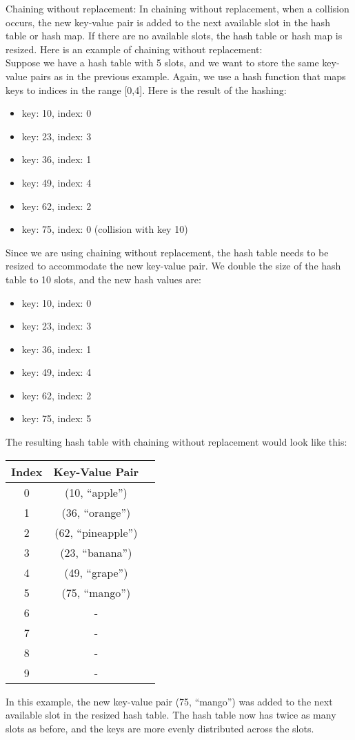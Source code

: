 \documentclass{article}
\begin{document}
Chaining without replacement: In chaining without replacement, when a collision occurs, the new key-value pair is added to the next available slot in the hash table or hash map. If there are no available slots, the hash table or hash map is resized. Here is an example of chaining without replacement:\\

Suppose we have a hash table with 5 slots, and we want to store the same key-value pairs as in the previous example. Again, we use a hash function that maps keys to indices in the range [0,4]. Here is the result of the hashing:

\begin{itemize}
	\item key: 10, index: 0
	\item key: 23, index: 3
	\item key: 36, index: 1
	\item key: 49, index: 4
	\item key: 62, index: 2
	\item key: 75, index: 0 (collision with key 10)
\end{itemize}
Since we are using chaining without replacement, the hash table needs to be resized to accommodate the new key-value pair. We double the size of the hash table to 10 slots, and the new hash values are:

\begin{itemize}
	\item key: 10, index: 0
	\item key: 23, index: 3
	\item key: 36, index: 1
	\item key: 49, index: 4
	\item key: 62, index: 2
	\item key: 75, index: 5 
\end{itemize}
\pagebreak
The resulting hash table with chaining without replacement would look like this:
\begin{table}[h]
	\centering
	\begin{tabular}{|c|c|c|}
	\hline
	\textbf{Index} & \textbf{Key-Value Pair} \\
	\hline
	0 & (10, ``apple'') \\
	\hline
	1 & (36, ``orange'') \\
	\hline
	2	& (62, ``pineapple'') \\
	\hline
	3	& (23, ``banana'') \\
	\hline
	4	& (49, ``grape'') \\
	\hline
	5	& (75, ``mango'') \\
	\hline
	6	& - \\
	\hline
	7	& - \\
	\hline
	8	& - \\
	\hline
	9	& - \\
	\hline
	\end{tabular}
\end{table}
In this example, the new key-value pair (75, ``mango'') was added to the next available slot in the resized hash table. The hash table now has twice as many slots as before, and the keys are more evenly distributed across the slots.
\end{document}
